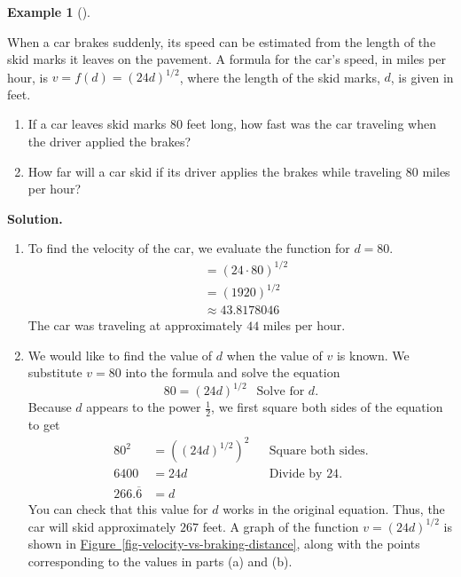 \documentclass[10pt,]{book}
\theoremstyle{plain}
\theoremstyle{definition}
\theoremstyle{definition}
\theoremstyle{definition}
\newtheorem{example}[theorem]{Example}
\theoremstyle{definition}
\theoremstyle{definition}
\numberwithin{equation}{section}
\newcommand{\amp}{ & }
\begin{document}
\begin{example}[]\label{example-car-brakes}

    When a car brakes suddenly, its speed can be estimated from the length of the skid marks it leaves on the pavement. A formula for the car’s speed, in miles per hour, is \(v = f (d) = (24d)^{1/2}\), where the length of the skid marks, \(d\), is given in feet.
%
\leavevmode%
\begin{enumerate}[label=*\alph**]
\item\hypertarget{li-506}{}If a car leaves skid marks \(80\) feet long, how fast was the car traveling when the driver applied the brakes?\item\hypertarget{li-507}{}How far will a car skid if its driver applies the brakes while traveling \(80\) miles per hour?\end{enumerate}
\par\medskip\noindent%
\textbf{Solution.}\quad \leavevmode%
\begin{enumerate}[label=*\alph**]
\item\hypertarget{li-508}{}To find the velocity of the car, we evaluate the function for \(d = 80\).
    \begin{align*}
     \amp= (24 \cdot 80)^{1/2} \\
     \amp = (1920)^{1/2} \\
     \amp \approx 43.8178046
    \end{align*}
    The car was traveling at approximately \(44\) miles per hour.\item\hypertarget{li-509}{}We would like to find the value of \(d\) when the value of \(v\) is known. We substitute \(v = 80\) into the formula and solve the equation
    \begin{equation*}80 = (24d)^{1/2} ~~ \text{ Solve for }d.\end{equation*}
    Because \(d\) appears to the power \(\frac{1}{2}\), we first square both sides of the equation to get
    \begin{align*}
    80^2 \amp = \left((24d)^{1/2}\right)^2 \amp\amp\text{Square both sides.}\\
    6400 \amp = 24d \amp\amp\text{Divide by }24.\\
    266.\overline{6} \amp = d
    \end{align*}
    You can check that this value for \(d\) works in the original equation. Thus, the car will skid approximately \(267\) feet. A graph of the function \(v = (24d)^{1/2}\) is shown in \hyperref[fig-velocity-vs-braking-distance]{Figure~\ref{fig-velocity-vs-braking-distance}}, along with the points corresponding to the values in parts (a) and (b).

\end{enumerate}
\end{example}
\end{document}
